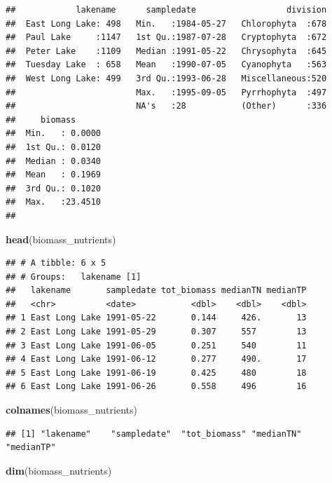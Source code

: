 \documentclass[12pt,]{article}
\newenvironment{Shaded}{\begin{snugshade}}{\end{snugshade}}
\newcommand{\KeywordTok}[1]{\textcolor[rgb]{0.13,0.29,0.53}{\textbf{#1}}}
\newcommand{\NormalTok}[1]{#1}
\begin{document}
\begin{verbatim}
##            lakename      sampledate                  division  
##  East Long Lake: 498   Min.   :1984-05-27   Chlorophyta  :678  
##  Paul Lake     :1147   1st Qu.:1987-07-28   Cryptophyta  :672  
##  Peter Lake    :1109   Median :1991-05-22   Chrysophyta  :645  
##  Tuesday Lake  : 658   Mean   :1990-07-05   Cyanophyta   :563  
##  West Long Lake: 499   3rd Qu.:1993-06-28   Miscellaneous:520  
##                        Max.   :1995-09-05   Pyrrhophyta  :497  
##                        NA's   :28           (Other)      :336  
##     biomass       
##  Min.   : 0.0000  
##  1st Qu.: 0.0120  
##  Median : 0.0340  
##  Mean   : 0.1969  
##  3rd Qu.: 0.1020  
##  Max.   :23.4510  
## 
\end{verbatim}

\begin{Shaded}
\begin{Highlighting}[]
\KeywordTok{head}\NormalTok{(biomass_nutrients)}
\end{Highlighting}
\end{Shaded}

\begin{verbatim}
## # A tibble: 6 x 5
## # Groups:   lakename [1]
##   lakename       sampledate tot_biomass medianTN medianTP
##   <chr>          <date>           <dbl>    <dbl>    <dbl>
## 1 East Long Lake 1991-05-22       0.144     426.       13
## 2 East Long Lake 1991-05-29       0.307     557        13
## 3 East Long Lake 1991-06-05       0.251     540        11
## 4 East Long Lake 1991-06-12       0.277     490.       17
## 5 East Long Lake 1991-06-19       0.425     480        18
## 6 East Long Lake 1991-06-26       0.558     496        16
\end{verbatim}

\begin{Shaded}
\begin{Highlighting}[]
\KeywordTok{colnames}\NormalTok{(biomass_nutrients)}
\end{Highlighting}
\end{Shaded}

\begin{verbatim}
## [1] "lakename"    "sampledate"  "tot_biomass" "medianTN"    "medianTP"
\end{verbatim}

\begin{Shaded}
\begin{Highlighting}[]
\KeywordTok{dim}\NormalTok{(biomass_nutrients)}
\end{Highlighting}
\end{Shaded}
\end{document}
